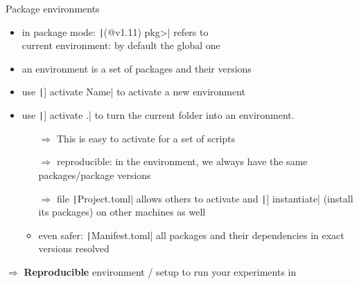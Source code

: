 \documentclass[aspectratio=169, 11pt, handout]{beamer}
\begin{document}
    \begin{frame}{Package environments}
        \begin{itemize}
            \item in package mode: \texttt|(@v1.11) pkg>| refers to\\
            current environment: by default the global one
            \item an \alert{environment} is a set of packages and their versions
            \item use \texttt|] activate Name| to activate a new environment
            \item use \texttt|] activate .| to turn the current folder into an environment.
            \begin{itemize}[<+->]
                \item[$\Rightarrow$] This is easy to activate for a set of scripts
                \item[$\Rightarrow$] reproducible: in the environment,
                we always have the same packages/package versions
                \item[$\Rightarrow$] file \texttt|Project.toml| allows others to
                activate and \texttt|] instantiate| (install its packages) on other machines as well
                \item even safer: \texttt|Manifest.toml| all packages and their dependencies in \alert{exact versions} resolved
            \end{itemize}
        \end{itemize}
        \pause
        \alert{\textbf{$\Rightarrow$}} \textbf{Reproducible} environment / setup to run your experiments in
    \end{frame}
\end{document}
